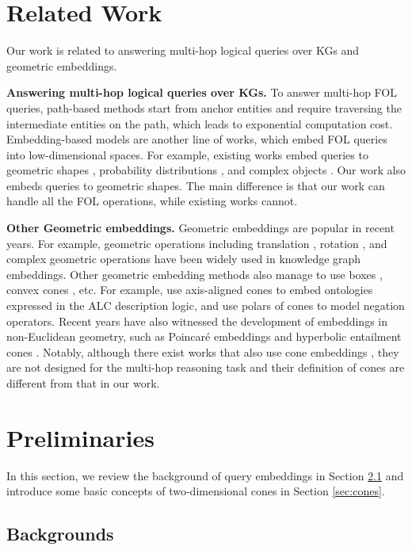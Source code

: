 \documentclass{article}
\begin{document}
\section{Related Work}
Our work is related to answering multi-hop logical queries over KGs and geometric embeddings.

\textbf{Answering multi-hop logical queries over KGs.} To answer multi-hop FOL queries, path-based methods \cite{deeppath,rl,ruge} start from anchor entities and require traversing the intermediate entities on the path, which leads to exponential computation cost. Embedding-based models are another line of works, which embed FOL queries into low-dimensional spaces. For example, existing works embed queries to geometric shapes \cite{gqe,q2b,traversing,chains}, probability distributions \cite{beta}, and complex objects \cite{quantum,faith}. Our work also embeds queries to geometric shapes. The main difference is that our work can handle all the FOL operations, while existing works cannot.

\textbf{Other Geometric embeddings.} Geometric embeddings are popular in recent years. For example, geometric operations including translation \cite{transe,transr}, rotation \cite{complex,rotate,n3,dura}, and complex geometric operations \cite{poincare_kg,hake} have been widely used in knowledge graph embeddings. Other geometric embedding methods also manage to use boxes \cite{improve_box}, convex cones \cite{denotion_prob,order_emb,cone_ijcai}, etc. For example, \citet{cone_ijcai} use axis-aligned cones to embed ontologies expressed in the ALC description logic, and use polars of cones to model negation operators.   
Recent years have also witnessed the development of embeddings in non-Euclidean geometry, such as Poincar\'e embeddings \cite{poincare_kg,poincare} and hyperbolic entailment cones \cite{ent_cone}. 
Notably, although there exist works that also use cone embeddings \cite{denotion_prob,order_emb,ent_cone,cone_ijcai}, they are not designed for the multi-hop reasoning task and their definition of cones are different from that in our work.

\section{Preliminaries}\label{sec:preliminaries}
In this section, we review the background of query embeddings in Section \ref{sec:background} and introduce some basic concepts of two-dimensional cones in Section \ref{sec:cones}.
\subsection{Backgrounds}\label{sec:background}
\end{document}
